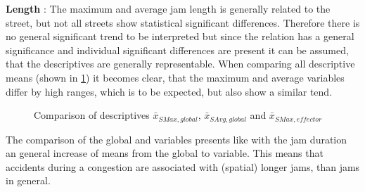 \textbf{Length} : The maximum and average jam length is generally related to the street, but not all streets show statistical significant differences. Therefore there is no general significant trend to be interpreted but since the relation has a general significance and individual significant differences are present it can be assumed, that the descriptives are generally representable. When comparing all descriptive means (shown in \cref{fig:baysis_summary_Str_length_barplot}) it becomes clear, that the maximum and average variables differ by high ranges, which is to be expected, but also show a similar tend.
\begin{figure}[ht!]
    \data
    \pgfplotstablesort[sort key=means, sort cmp=float >]{\datasorted}{\data}
    \tiny
    \centering
    \caption{Comparison of descriptives $\bar{x}_{SMax,global}$, $\bar{x}_{SAvg,global}$ and $\bar{x}_{SMax,effector}$}
    \label{fig:baysis_summary_Str_length_barplot}
\end{figure}
The comparison of the global and  variables presents like with the jam duration an general increase of means from the global to  variable. This means that accidents during a congestion are associated with (spatial) longer jams, than jams in general.

